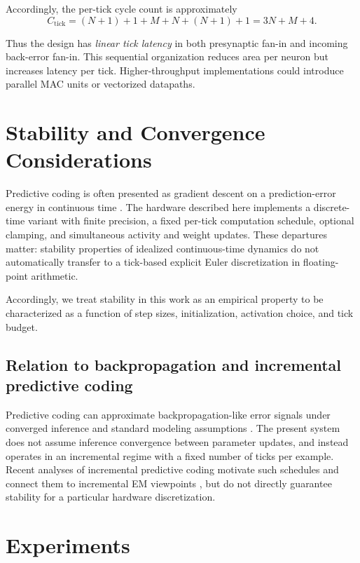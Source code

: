 \documentclass{article}
\begin{document}
Accordingly, the per-tick cycle count is approximately
\[
C_{\text{tick}} = (N+1) + 1 + M + N + (N+1) + 1 = 3N + M + 4.
\]

Thus the design has \emph{linear tick latency} in both presynaptic fan-in and incoming
back-error fan-in. This sequential organization reduces area per neuron but
increases latency per tick. Higher-throughput implementations could introduce
parallel MAC units or vectorized datapaths.

\section{Stability and Convergence Considerations}
\label{sec:stability}

Predictive coding is often presented as gradient descent on a prediction-error energy in continuous time \cite{friston2005theory}. The hardware described here implements a discrete-time variant with finite precision, a fixed per-tick computation schedule, optional clamping, and simultaneous activity and weight updates. These departures matter: stability properties of idealized continuous-time dynamics do not automatically transfer to a tick-based explicit Euler discretization in floating-point arithmetic.

Accordingly, we treat stability in this work as an empirical property to be characterized as a function of step sizes, initialization, activation choice, and tick budget.

\subsection{Relation to backpropagation and incremental predictive coding}
Predictive coding can approximate backpropagation-like error signals under converged inference and standard modeling assumptions \cite{Whittington2017}. The present system does not assume inference convergence between parameter updates, and instead operates in an incremental regime with a fixed number of ticks per example. Recent analyses of incremental predictive coding motivate such schedules and connect them to incremental EM viewpoints \cite{salvatori2023stable, neal1998view, karimi2019global}, but do not directly guarantee stability for a particular hardware discretization.

\section{Experiments}
\label{sec:experiments}
\end{document}
